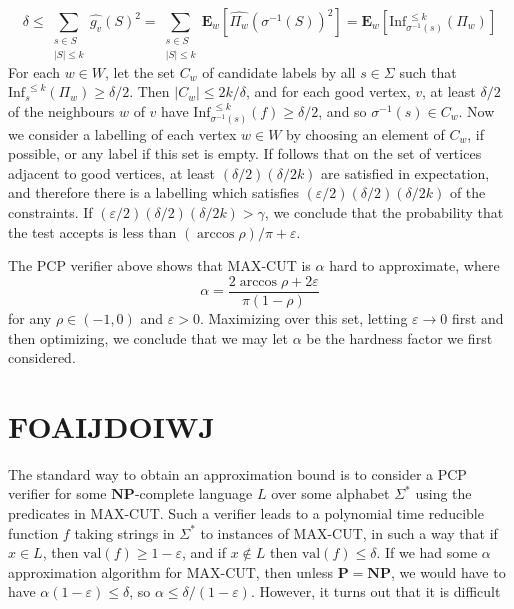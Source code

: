 %
\[ \delta \leq \sum_{\substack{s \in S\\|S| \leq k}} \widehat{ g_v }(S)^2 = \sum_{\substack{s \in S\\|S| \leq k}} \mathbf{E}_w \left[ \widehat{\Pi_w}(\sigma^{-1}(S))^2 \right] = \mathbf{E}_w \left[ \text{Inf}_{\sigma^{-1}(s)}^{\ \leq k}(\Pi_w) \right] \]
%
For each $w \in W$, let the set $C_w$ of candidate labels by all $s \in \Sigma$ such that $\text{Inf}_s^{\ \leq k}(\Pi_w) \geq \delta/2$. Then $|C_w| \leq 2k/\delta$, and for each good vertex, $v$, at least $\delta/2$ of the neighbours $w$ of $v$ have $\text{Inf}_{\sigma^{-1}(s)}^{\ \leq k} (f) \geq \delta/2$, and so $\sigma^{-1}(s) \in C_w$. Now we consider a labelling of each vertex $w \in W$ by choosing an element of $C_w$, if possible, or any label if this set is empty. If follows that on the set of vertices adjacent to good vertices, at least $(\delta/2)(\delta/2k)$ are satisfied in expectation, and therefore there is a labelling which satisfies $(\varepsilon/2)(\delta/2)(\delta/2k)$ of the constraints. If $(\varepsilon/2)(\delta/2)(\delta/2k) > \gamma$, we conclude that the probability that the test accepts is less than $(\arccos \rho)/\pi + \varepsilon$.

The PCP verifier above shows that MAX-CUT is $\alpha$ hard to approximate, where
%
\[ \alpha = \frac{2 \arccos \rho + 2\varepsilon}{\pi(1 - \rho)} \]
%
for any $\rho \in (-1,0)$ and $\varepsilon > 0$. Maximizing over this set, letting $\varepsilon \to 0$ first and then optimizing, we conclude that we may let $\alpha$ be the hardness factor we first considered.


\section{FOAIJDOIWJ}

The standard way to obtain an approximation bound is to consider a PCP verifier for some $\mathbf{NP}$-complete language $L$ over some alphabet $\Sigma^*$ using the predicates in MAX-CUT. Such a verifier leads to a polynomial time reducible function $f$ taking strings in $\Sigma^*$ to instances of MAX-CUT, in such a way that if $x \in L$, then $\text{val}(f) \geq 1 - \varepsilon$, and if $x \not \in L$ then $\text{val}(f) \leq \delta$. If we had some $\alpha$ approximation algorithm for MAX-CUT, then unless $\mathbf{P} = \mathbf{NP}$, we would have to have $\alpha (1 - \varepsilon) \leq \delta$, so $\alpha \leq \delta/(1-\varepsilon)$. However, it turns out that it is difficult

